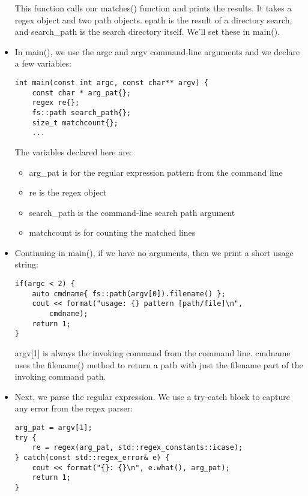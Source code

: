 \begin{itemize}
This function calls our matches() function and prints the results. It takes a regex object and two path objects. epath is the result of a directory search, and search\_path is the search directory itself. We'll set these in main().

\item 
In main(), we use the argc and argv command-line arguments and we declare a few variables:

\begin{lstlisting}[style=styleCXX]
int main(const int argc, const char** argv) {
	const char * arg_pat{};
	regex re{};
	fs::path search_path{};
	size_t matchcount{};
	...
\end{lstlisting}

The variables declared here are:

\begin{itemize}
\item
arg\_pat is for the regular expression pattern from the command line

\item
re is the regex object

\item
search\_path is the command-line search path argument

\item
matchcount is for counting the matched lines
\end{itemize}

\item 
Continuing in main(), if we have no arguments, then we print a short usage string:

\begin{lstlisting}[style=styleCXX]
if(argc < 2) {
	auto cmdname{ fs::path(argv[0]).filename() };
	cout << format("usage: {} pattern [path/file]\n",
		cmdname);
	return 1;
}
\end{lstlisting}

argv[1] is always the invoking command from the command line. cmdname uses the filename() method to return a path with just the filename part of the invoking command path.

\item 
Next, we parse the regular expression. We use a try-catch block to capture any error from the regex parser:

\begin{lstlisting}[style=styleCXX]
arg_pat = argv[1];
try {
	re = regex(arg_pat, std::regex_constants::icase);
} catch(const std::regex_error& e) {
	cout << format("{}: {}\n", e.what(), arg_pat);
	return 1;
}
\end{lstlisting}


\end{itemize}
